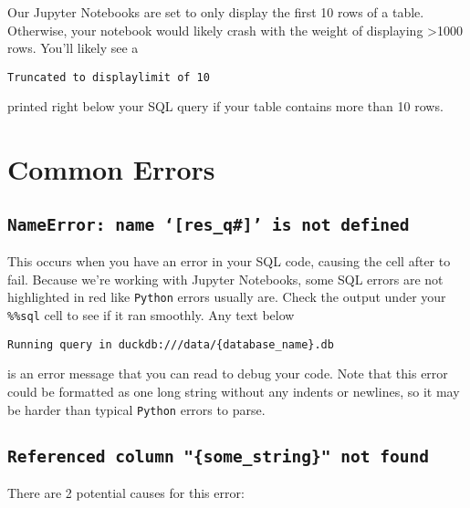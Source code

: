 \documentclass[
  letterpaper,
  DIV=11,
  numbers=noendperiod]{scrreprt}
\begin{document}
Our Jupyter Notebooks are set to only display the first 10 rows of a
table. Otherwise, your notebook would likely crash with the weight of
displaying \textgreater1000 rows. You'll likely see a

\texttt{Truncated\ to\ displaylimit\ of\ 10}

printed right below your SQL query if your table contains more than 10
rows.

\section{Common Errors}\label{common-errors}

\subsection{\texorpdfstring{\texttt{NameError:\ name\ ‘{[}res\_q\#{]}’\ is\ not\ defined}}{NameError: name `{[}res\_q\#{]}' is not defined}}\label{nameerror-name-res_q-is-not-defined}

This occurs when you have an error in your SQL code, causing the cell
after to fail. Because we're working with Jupyter Notebooks, some SQL
errors are not highlighted in red like \texttt{Python} errors usually
are. Check the output under your \texttt{\%\%sql} cell to see if it ran
smoothly. Any text below

\texttt{Running\ query\ in\ \textquotesingle{}duckdb:///data/\{database\_name\}.db}

is an error message that you can read to debug your code. Note that this
error could be formatted as one long string without any indents or
newlines, so it may be harder than typical \texttt{Python} errors to
parse.

\subsection{\texorpdfstring{\texttt{Referenced\ column\ "\{some\_string\}"\ not\ found}}{Referenced column "\{some\_string\}" not found}}\label{referenced-column-some_string-not-found}

There are 2 potential causes for this error:
\end{document}
